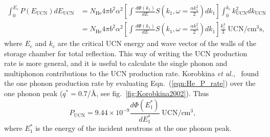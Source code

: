 \begin{equation}
\label{eqn:He_P_rate}
\begin{split}
\int _0 ^{E_c} P(E_{\text{UCN}})dE_{\text{UCN}} &= N_{\text{He}} 4 \pi b^2
\alpha^2 \left[ \int \frac{d\Phi(k_1)}{dE} S \left( k_1,
  \omega=\frac{\alpha k_1^2}{2} \right)dk_1 \right] \int_0^{k_c}
k_{\text{UCN}}^2dk_{\text{UCN}} \\ &=N_{\text{He}} 4 \pi b^2 \alpha^2 \left[
  \int \frac{d\Phi(k_1)}{dE} S \left( k_1, \omega=\frac{\alpha
    k_1^2}{2} \right) dk_1 \right] \frac{k_c^3}{3}\;
\text{UCN}/\text{cm}^3 \text{s},
\end{split}
\end{equation}
where $E_c$ and $k_c$ are the critical UCN energy and wave vector of
the walls of the storage chamber for total reflection. This way of
writing the UCN production rate is more general, and it is useful to
calculate the single phonon and multiphonon contributions to the UCN
production rate. Korobkina {\it{et al.}},~\cite{Korobkina2002} found
the one phonon production rate by evaluating
Eqn.~(\ref{eqn:He_P_rate}) over the one phonon peak ($q^*=0.7$/\AA,
see fig.~\ref{fig:Korobkina2002}).  Thus
\begin{equation}
P_{\text{UCN}}=9.44 \times 10^{-9}\frac{d\Phi (E_1^*)}{dE_1^*} \;
\text{UCN}/\text{cm}^3,
\end{equation}
 where $E_1^*$ is the energy of the incident neutrons at the one phonon peak.






